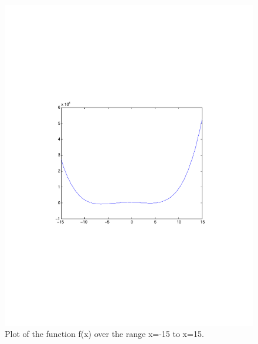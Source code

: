 \documentclass[11pt]{article}
\begin{document}
\begin{figure}[htbp]
	\centerline{\includegraphics[width=1\textwidth]{fplot.pdf}}
	\caption{\label{p1}%
	Plot of the function f(x) over the range x=-15 to x=15.}
\end{figure}
\end{document}
